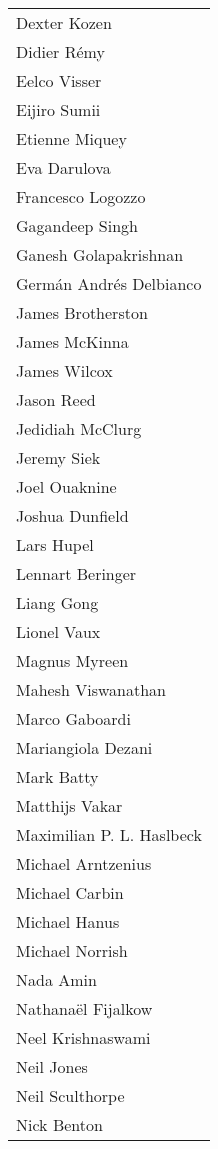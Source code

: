 \begin{tabular}[t]{@{}p{\namewidth}}
Dexter Kozen \\
Didier R\'{e}my \\
Eelco Visser \\
Eijiro Sumii \\
Etienne Miquey \\
Eva Darulova \\
Francesco Logozzo \\
Gagandeep Singh \\
Ganesh Golapakrishnan \\
Germ\'{a}n Andr\'{e}s Delbianco \\
James Brotherston \\
James McKinna \\
James Wilcox \\
Jason Reed \\
Jedidiah McClurg \\
Jeremy Siek \\
Joel Ouaknine \\
Joshua Dunfield \\
Lars Hupel \\
Lennart Beringer \\
Liang Gong \\
Lionel Vaux \\
Magnus Myreen \\
Mahesh Viswanathan \\
Marco Gaboardi \\
Mariangiola Dezani \\
Mark Batty \\
Matthijs Vakar \\
Maximilian P. L. Haslbeck \\
Michael Arntzenius \\
Michael Carbin \\
Michael Hanus \\
Michael Norrish \\
Nada Amin \\
Nathana\"{e}l Fijalkow \\
Neel Krishnaswami \\
Neil Jones \\
Neil Sculthorpe \\
Nick Benton 
\end{tabular}

